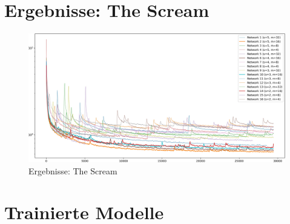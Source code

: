 \section{Ergebnisse: The Scream}
\begin{figure}[H]
	\centering
	\includegraphics[width=1.00\textwidth]{resources/content/experiments/fast_loss_plot_experiment2.jpg}
	\caption{Ergebnisse: The Scream}
	\label{img:results_the_scream}
\end{figure}

\pagebreak

\section{Trainierte Modelle}

